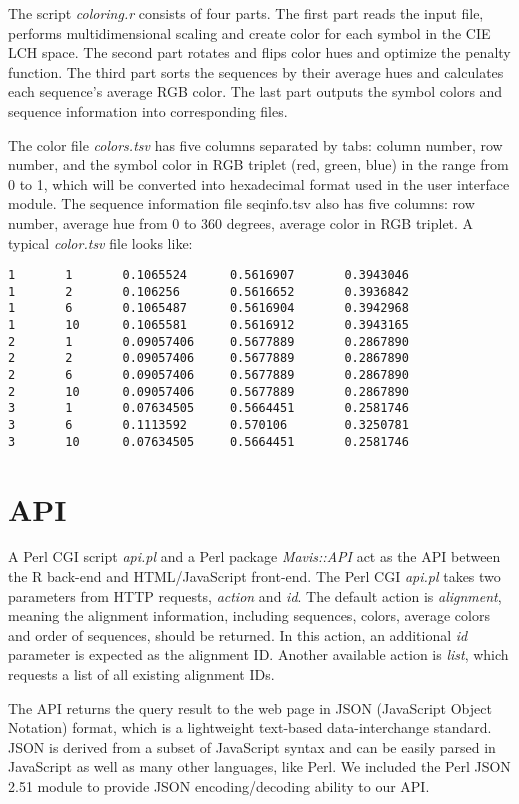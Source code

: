 The script \emph{coloring.r} consists of four parts. The first part reads the input file, performs multidimensional scaling and create color for each symbol in the CIE LCH space. The second part rotates and flips color hues and optimize the penalty function. The third part sorts the sequences by their average hues and calculates each sequence’s average RGB color. The last part outputs the symbol colors and sequence information into corresponding files.

The color file \emph{colors.tsv} has five columns separated by tabs: column number, row number, and the symbol color in RGB triplet (red, green, blue) in the range from 0 to 1, which will be converted into hexadecimal format used in the user interface module. The sequence information file seqinfo.tsv also has five columns: row number, average hue from 0 to 360 degrees, average color in RGB triplet. A typical \emph{color.tsv} file looks like:
\def\baselinestretch{1}
\begin{verbatim}
1       1       0.1065524      0.5616907       0.3943046
1       2       0.106256       0.5616652       0.3936842
1       6       0.1065487      0.5616904       0.3942968
1       10      0.1065581      0.5616912       0.3943165
2       1       0.09057406     0.5677889       0.2867890
2       2       0.09057406     0.5677889       0.2867890
2       6       0.09057406     0.5677889       0.2867890
2       10      0.09057406     0.5677889       0.2867890
3       1       0.07634505     0.5664451       0.2581746
3       6       0.1113592      0.570106        0.3250781
3       10      0.07634505     0.5664451       0.2581746
\end{verbatim}

\section{API}

A Perl CGI script \emph{api.pl} and a Perl package \emph{Mavis::API} act as the API between the R back-end and HTML/JavaScript front-end. The Perl CGI \emph{api.pl} takes two parameters from HTTP requests, \emph{action} and \emph{id}. The default action is \emph{alignment}, meaning the alignment information, including sequences, colors, average colors and order of sequences, should be returned. In this action, an additional \emph{id} parameter is expected as the alignment ID. Another available action is \emph{list}, which requests a list of all existing alignment IDs.

The API returns the query result to the web page in JSON (JavaScript Object Notation) format, which is a lightweight text-based data-interchange standard. JSON is derived from a subset of JavaScript syntax and can be easily parsed in JavaScript as well as many other languages, like Perl. We included the Perl JSON 2.51 module to provide JSON encoding/decoding ability to our API. \cite{crockford2006application}

